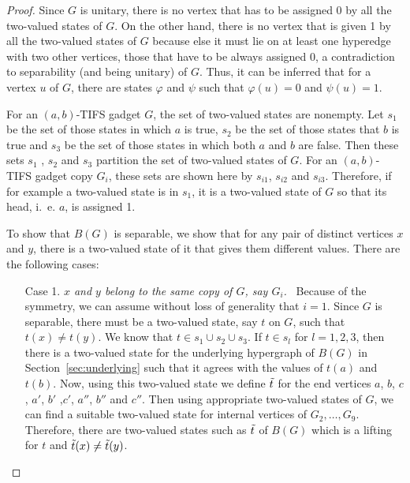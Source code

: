 \documentclass[%
12pt,
prereprint,
showpacs,
showkeys,
preprintnumbers,
amsmath,amssymb,
aps,
pra,
longbibliography,
notitlepage
]{revtex4-1}
\theoremstyle{definition}
\begin{document}
        \begin{proof}
                Since $G$ is unitary, there is no vertex that has to be assigned 0 by all the two-valued states of $G$. On the other hand, there is no vertex that is given 1 by all the two-valued states of $G$ because else it must lie on at least one hyperedge with two other vertices, those that have to be always assigned 0, a contradiction to separability (and being unitary) of $G$. Thus, it can be inferred that for a vertex $u$ of $G$, there are states $\varphi$ and $\psi$ such that $\varphi (u)=0$ and $\psi (u)=1$.

                For an $(a ,b )$-TIFS gadget $G$, the set of two-valued states are nonempty. Let $s_{1}$ be the set of those states in which $a$ is true, $s_{2}$ be the set of those states that $b$ is true and $s_{3}$ be the set of those states in which both $a$ and $b$ are false. Then these sets $s_{1}$ , $s_{2}$ and $s_{3}$ partition the set of two-valued states of $G$. For an $(a ,b )$-TIFS gadget copy $G_i$, these sets are shown here by $s_{i1}$, $s_{i2}$ and $s_{i3}$. Therefore, if for example a two-valued state is in $s_{1}$, it is a two-valued state of $G$ so that its head, i.~e. $a$, is assigned 1.

                To show that $B(G)$ is separable, we show that for any pair of distinct vertices $x$ and $y$, there is a two-valued state of it that gives them different values. There are the following cases:

                \begin{itemize}
                        \item[Case 1.] \emph{$x$ and $y$ belong to the same copy of $G$, say $G_i$.} \ Because of the symmetry, we can assume without loss of generality that $i=1$.  Since $G$ is separable, there must be a two-valued state, say $t$ on $G$, such that $t(x)\neq t(y)$. We know that $t\in s_{1}\cup s_{2}\cup s_{3}$. If $t\in s_l$ for $l=1,2,3$, then there is a two-valued state for the underlying hypergraph of $B(G)$ in Section~\ref{sec:underlying} such that it agrees with the values of $t(a)$ and $t(b)$. Now, using this two-valued state we define $\Tilde{t}$ for the end vertices $a$, $b$, $c$, $a'$, $b'$ ,$c'$, $a''$, $b''$ and $c''$. Then using appropriate two-valued states of $G$, we can find a suitable two-valued state for internal vertices of $G_2,\ldots,G_9$. Therefore, there are two-valued states such as $\Tilde{t}$ of $B(G)$ which is a lifting for $t$ and  $\Tilde{t}(x) \neq \Tilde{t}(y)$.



\end{itemize}
\end{proof}
\end{document}
